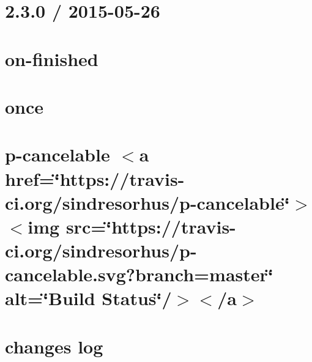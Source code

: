 \let\mypdfximage\pdfximage\def\pdfximage{\immediate\mypdfximage}\documentclass[twoside]{book}
\newcommand{\+}{\discretionary{\mbox{\scriptsize$\hookleftarrow$}}{}{}}
\begin{document}
\chapter{2.3.0 / 2015-\/05-\/26}
\label{md__c_1__git_hub__p_r_o_y_e_c_t_o-_i_i_i-_g_o_t_rest-api_node_modules_on-finished__h_i_s_t_o_r_y}

\chapter{on-\/finished}
\label{md__c_1__git_hub__p_r_o_y_e_c_t_o-_i_i_i-_g_o_t_rest-api_node_modules_on-finished__r_e_a_d_m_e}

\chapter{once}
\label{md__c_1__git_hub__p_r_o_y_e_c_t_o-_i_i_i-_g_o_t_rest-api_node_modules_once__r_e_a_d_m_e}

\chapter{p-\/cancelable $<$a href=\char`\"{}https\+://travis-\/ci.\+org/sindresorhus/p-\/cancelable\char`\"{}$>$$<$img src=\char`\"{}https\+://travis-\/ci.\+org/sindresorhus/p-\/cancelable.\+svg?branch=master\char`\"{} alt=\char`\"{}\+Build Status\char`\"{}/$>$$<$/a$>$}
\label{md__c_1__git_hub__p_r_o_y_e_c_t_o-_i_i_i-_g_o_t_rest-api_node_modules_p-cancelable_readme}

\chapter{changes log}
\label{md__c_1__git_hub__p_r_o_y_e_c_t_o-_i_i_i-_g_o_t_rest-api_node_modules_package-json_node_modules_semver__c_h_a_n_g_e_l_o_g}

\end{document}
